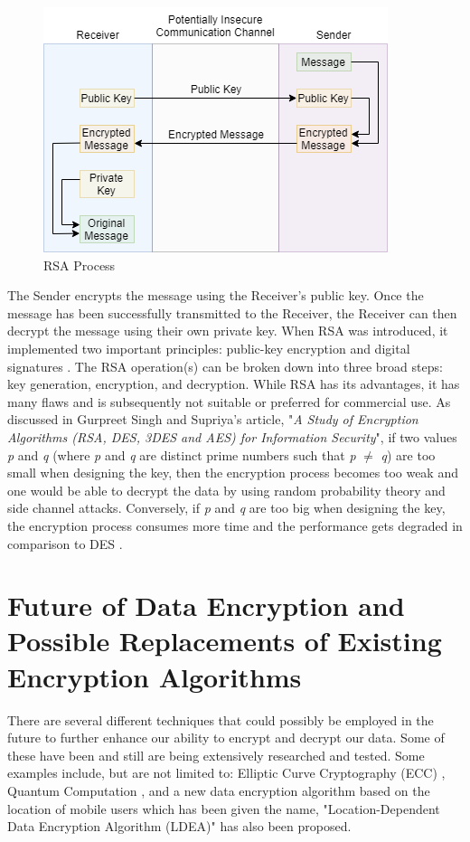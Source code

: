 \documentclass[journal]{IEEEtran}
\begin{document}
\newline
\begin{figure}[!h]
    \centering
    \includegraphics[scale=.5]{rsa}
    \caption{RSA Process}
    \label{fig:rsa}
\end{figure}

The Sender encrypts the message using the Receiver's public key. Once the message has been successfully transmitted to the Receiver, the Receiver can then decrypt the message using their own private key. When RSA was introduced, it implemented two important principles: public-key encryption and digital signatures \cite{RSA}. The RSA operation(s) can be broken down into three broad steps: key generation, encryption, and decryption. While RSA has its advantages, it has many flaws and is subsequently not suitable or preferred for commercial use. As discussed in Gurpreet Singh and Supriya's article, "\textit{A Study of Encryption Algorithms (RSA, DES, 3DES and AES) for Information Security}", if two values \textit{p} and \textit{q} (where \textit{p} and \textit{q} are distinct prime numbers such that \textit{p} $\neq$ \textit{q}) are too small when designing the key, then the encryption process becomes too weak and one would be able to decrypt the data by using random probability theory and side channel attacks. Conversely, if \textit{p} and \textit{q} are too big when designing the key, the encryption process consumes more time and the performance gets degraded in comparison to DES \cite{Encryption_Study}. 

\section{\textbf{Future of Data Encryption and Possible Replacements of Existing Encryption Algorithms}}
There are several different techniques that could possibly be employed in the future to further enhance our ability to encrypt and decrypt our data. Some of these have been and still are being extensively researched and tested. Some examples include, but are not limited to: Elliptic Curve Cryptography (ECC) \cite{ecc}, Quantum Computation \cite{quantum_computing_encryption}, and a new data encryption algorithm based on the location of mobile users which has been given the name, "Location-Dependent Data Encryption Algorithm (LDEA)" \cite{new_encryption_mobile} has also been proposed.
\end{document}
